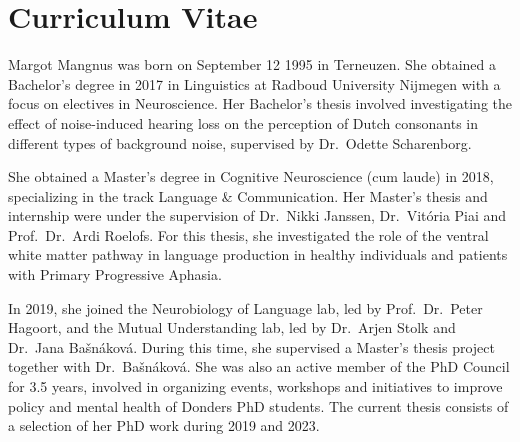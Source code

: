 \chapter*{Curriculum Vitae}
\label{ch:cv}

Margot Mangnus was born on September 12 1995 in Terneuzen. She obtained a Bachelor's degree in 2017 in Linguistics at Radboud University Nijmegen with a focus on electives in Neuroscience. Her Bachelor's thesis involved investigating the effect of noise-induced hearing loss on the perception of Dutch consonants in different types of background noise, supervised by Dr.~Odette Scharenborg. 

She obtained a Master's degree in Cognitive Neuroscience (cum laude) in 2018, specializing in the track Language \& Communication. Her Master's thesis and internship were under the supervision of Dr.~Nikki Janssen, Dr.~Vit\'{o}ria Piai and Prof.~Dr.~Ardi Roelofs. For this thesis, she investigated the role of the ventral white matter pathway in language production in healthy individuals and patients with Primary Progressive Aphasia. 

In 2019, she joined the Neurobiology of Language lab, led by Prof.~Dr.~Peter Hagoort, and the Mutual Understanding lab, led by Dr.~Arjen Stolk and Dr.~Jana Ba\v{s}n\'{a}kov\'{a}. During this time, she supervised a Master's thesis project together with Dr.~Ba\v{s}n\'{a}kov\'{a}. She was also an active member of the PhD Council for 3.5 years, involved in organizing events, workshops and initiatives to improve policy and mental health of Donders PhD students. The current thesis consists of a selection of her PhD work during 2019 and 2023.